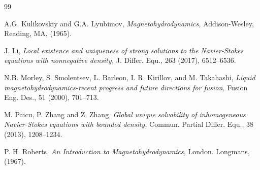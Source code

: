 \documentclass[11pt]{article}
\numberwithin{equation}{section}
\begin{document}
\begin{center}
\begin{thebibliography}{99}


 A.G. Kulikovskiy and G.A. Lyubimov, {\it  Magnetohydrodynamics,} Addison-Wesley, Reading, MA, (1965).

 J. Li,  {\it Local existence and uniqueness of strong solutions to the Navier-Stokes equations
with nonnegative density,}  J. Differ. Equ.,  263 (2017), 6512--6536.








 N.B. Morley, S. Smolentsev, L. Barleon, I. R. Kirillov, and M. Takahashi,  {\it Liquid magnetohydrodynamics-recent progress and future
directions for fusion,} Fusion Eng. Des., 51 (2000), 701--713.

M. Paicu, P. Zhang and Z. Zhang, {\it Global unique solvability of inhomogeneous Navier-Stokes equations with bounded density,} Commun. Partial Differ. Equ.,  38 (2013), 1208--1234.


 P. H. Roberts, {\it An Introduction to Magnetohydrodynamics,}  London. Longmans, (1967).


\end{thebibliography}
\end{center}
\end{document}
